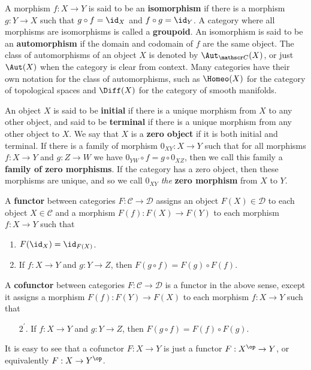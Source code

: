A morphism $f : X \rightarrow Y$ is said to be an \textbf{isomorphism} if there is a morphism $g : Y \rightarrow X$ such that $g \circ f = \id_X$ and $f \circ g = \id_Y$. A category where all morphisms are isomorphisms is called a \textbf{groupoid}. An isomorphism is said to be an \textbf{automorphism} if the domain and codomain of $f$ are the same object. The class of automorphisms of an object $X$ is denoted by $\Aut_{\mathscr C}(X)$, or just $\Aut(X)$ when the category is clear from context. Many categories have their own notation for the class of automorphisms, such as $\Homeo(X)$ for the category of topological spaces and $\Diff(X)$ for the category of smooth manifolds.

An object $X$ is said to be \textbf{initial} if there is a unique morphism from $X$ to any other object, and said to be \textbf{terminal} if there is a unique morphism from any other object to $X$. We say that $X$ is a \textbf{zero object} if it is both initial and terminal. If there is a family of morphism $0_{XY} : X \rightarrow Y$ such that for all morphisms $f : X \rightarrow Y$ and $g : Z \rightarrow W$ we have $0_{YW} \circ f = g \circ 0_{XZ}$, then we call this family a \textbf{family of zero morphisms}. If the category has a zero object, then these morphisms are unique, and so we call $0_{XY}$ \emph{the} \textbf{zero morphism} from $X$ to $Y$. 

A \textbf{functor} between categories $F : \mathscr C \rightarrow \mathscr D$ assigns an object $F(X) \in \mathscr D$ to each object $X \in \mathscr C$ and a morphism $F(f) : F(X) \rightarrow F(Y)$ to each morphism $f : X \rightarrow Y$ such that
\begin{enumerate}
	\item $F(\id_X) = \id_{F(X)}$.
	\item If $f : X \rightarrow Y$ and $g : Y \rightarrow Z$, then $F(g \circ f) = F(g) \circ F(f)$.
\end{enumerate}
A \textbf{cofunctor} between categories $F : \mathscr C \rightarrow \mathscr D$ is a functor in the above sense, except it assigns a morphism $F(f) : F(Y) \rightarrow F(X)$ to each morphism $f : X \rightarrow Y$ such that
\begin{enumerate}
	\item[$2^\prime$.] If $f : X \rightarrow Y$ and $g : Y \rightarrow Z$, then $F(g \circ f) = F(f) \circ F(g)$.
\end{enumerate}
It is easy to see that a cofunctor $F : X \rightarrow Y$ is just a functor $F : X^\op \rightarrow Y$, or equivalently $F : X \rightarrow Y^\op$.

